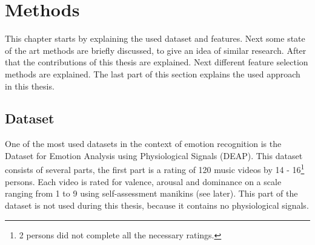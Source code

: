 \chapter{Methods}
{\samenvatting This chapter starts by explaining the used dataset and features. Next some state of the art methods are briefly discussed, to give an idea of similar research. After that the contributions of this thesis are explained. Next different feature selection methods are explained. The last part of this section explains the used approach in this thesis.}

\section{Dataset}
One of the most used datasets in the context of emotion recognition is the Dataset for Emotion Analysis using Physiological Signals (DEAP)\cite{DEAP}. This dataset consists of several parts, the first part is a rating of 120 music videos by 14 - 16\footnote{2 persons did not complete all the necessary ratings.} persons. Each video is rated for valence, arousal and dominance on a scale ranging from 1 to 9 using self-assessment manikins (see later). This part of the dataset is not used during this thesis, because it contains no physiological signals.

\npar

